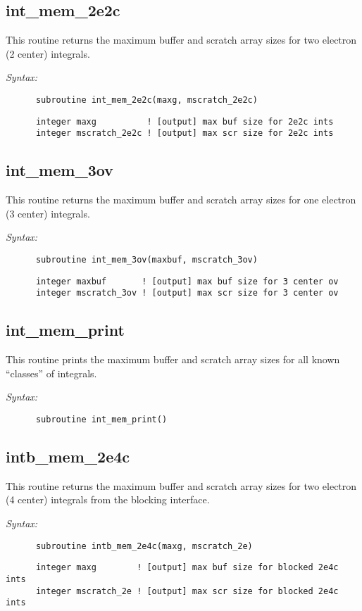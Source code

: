 \subsection{int\_mem\_2e2c} 
This routine returns the maximum buffer and scratch array 
sizes for two electron (2 center) 
integrals. 
 
{\it Syntax:} 
\begin{verbatim} 
      subroutine int_mem_2e2c(maxg, mscratch_2e2c) 
\end{verbatim} 
\begin{verbatim} 
      integer maxg          ! [output] max buf size for 2e2c ints 
      integer mscratch_2e2c ! [output] max scr size for 2e2c ints 
\end{verbatim} 
\subsection{int\_mem\_3ov} 
This routine returns the maximum buffer and scratch array 
sizes for one electron (3 center) 
integrals. 
 
{\it Syntax:} 
\begin{verbatim} 
      subroutine int_mem_3ov(maxbuf, mscratch_3ov) 
\end{verbatim} 
\begin{verbatim} 
      integer maxbuf       ! [output] max buf size for 3 center ov 
      integer mscratch_3ov ! [output] max scr size for 3 center ov 
\end{verbatim} 
\subsection{int\_mem\_print} 
This routine prints the maximum buffer and scratch array 
sizes for all known ``classes'' of integrals. 
 
{\it Syntax:} 
\begin{verbatim} 
      subroutine int_mem_print() 
\end{verbatim} 
\subsection{intb\_mem\_2e4c} 
This routine returns the maximum buffer and scratch array 
sizes for two electron (4 center) 
integrals from the blocking interface. 
 
{\it Syntax:} 
\begin{verbatim} 
      subroutine intb_mem_2e4c(maxg, mscratch_2e) 
\end{verbatim} 
\begin{verbatim} 
      integer maxg        ! [output] max buf size for blocked 2e4c ints 
      integer mscratch_2e ! [output] max scr size for blocked 2e4c ints 
\end{verbatim} 
